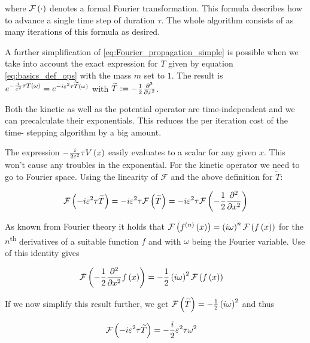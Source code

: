 where $\mathcal{F}\left(\cdot\right)$ denotes a formal Fourier transformation. This formula describes
how to advance a single time step of duration $\tau$. The whole algorithm consists
of as many iterations of this formula as desired.

A further simplification of \eqref{eq:Fourier_propagation_simple} is possible when
we take into account the exact expression for $T$ given by equation \eqref{eq:basics_def_ops}
with the mass $m$ set to $1$. The result is $e^{-\frac{i}{\varepsilon^2} \tau T\left( \omega \right)}
= e^{-i\varepsilon^2 \tau \widetilde{T}\left( \omega \right)}$ with $\widetilde{T} := -\frac{1}{2}\frac{\partial^2}{\partial x^2}$.

Both the kinetic as well as the potential operator are time-independent and we can
precalculate their exponentials. This reduces the per iteration cost of the time-
stepping algorithm by a big amount.

The expression $-\frac{i}{2\varepsilon^2} \tau V\left( x \right)$ easily evaluates
to a scalar for any given $x$. This won't cause any troubles in the exponential.
For the kinetic operator we need to go to Fourier space. Using the linearity of $\mathcal{F}$
and the above definition for $\widetilde{T}$:

\begin{equation*}
  \mathcal{F}\left(-i \varepsilon^2 \tau \widetilde{T}\right)
  = -i \varepsilon^2 \tau \mathcal{F}\left(\widetilde{T}\right)
  = -i \varepsilon^2 \tau \mathcal{F}\left(-\frac{1}{2}\frac{\partial^2}{\partial x^2}\right)
\end{equation*}

As known from Fourier theory it holds that $\mathcal{F}\left(f^{\left(n\right)}\left( x \right)\right) = \left(i\omega\right)^n \mathcal{F}\left(f\left( x \right)\right)$
for the $n$\textsuperscript{th} derivatives of a suitable function $f$ and with $\omega$ being the
Fourier variable. Use of this identity gives

\begin{equation*}
\begin{split}
  \mathcal{F}\left(-\frac{1}{2}\frac{\partial^2}{\partial x^2} f\left( x \right)\right)
  & = -\frac{1}{2} \left(i\omega\right)^2 \mathcal{F}\left(f\left( x \right)\right)
\end{split}
\end{equation*}

If we now simplify this result further, we get $\mathcal{F}\left(\widetilde{T}\right) = -\frac{1}{2} \left(i\omega\right)^2$
and thus

\begin{equation}
\begin{split}
  \mathcal{F}\left(-i \varepsilon^2 \tau \widetilde{T}\right)
  & = -\frac{i}{2} \varepsilon^2 \tau \omega^2
\end{split}
\end{equation}

